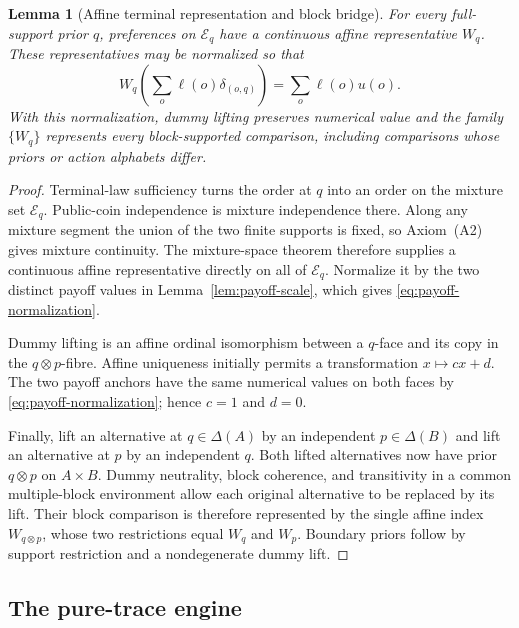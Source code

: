 \documentclass[11pt,a4paper]{article}
\newtheorem{lemma}[theorem]{Lemma}
\theoremstyle{definition}
\newcommand{\D}{\Delta}
\newcommand{\1}{\mathbf 1}
\begin{document}
\begin{lemma}[Affine terminal representation and block bridge]\label{lem:affine-bridge}
For every full-support prior $q$, preferences on $\mathcal E_q$ have a continuous affine representative $W_q$.
These representatives may be normalized so that
\begin{equation}
 W_q\!\left(\sum_o\ell(o)\delta_{(o,q)}\right)=\sum_o\ell(o)u(o).
 \label{eq:payoff-normalization}
\end{equation}
With this normalization, dummy lifting preserves numerical value and the family $\{W_q\}$ represents every
block-supported comparison, including comparisons whose priors or action alphabets differ.
\end{lemma}

\begin{proof}
Terminal-law sufficiency turns the order at $q$ into an order on the mixture set $\mathcal E_q$.  Public-coin
independence is mixture independence there.  Along any mixture segment the union of the two finite supports is fixed,
so Axiom~\textup{(A2)} gives mixture continuity.  The mixture-space theorem therefore supplies a continuous affine
representative directly on all of $\mathcal E_q$.  Normalize it by the two distinct payoff values in
Lemma~\ref{lem:payoff-scale}, which gives
\eqref{eq:payoff-normalization}.

Dummy lifting is an affine ordinal isomorphism between a $q$-face and its copy in the $q\otimes p$-fibre.  Affine
uniqueness initially permits a transformation $x\mapsto cx+d$.  The two payoff anchors have the same numerical values
on both faces by \eqref{eq:payoff-normalization}; hence $c=1$ and $d=0$.

Finally, lift an alternative at $q\in\D(A)$ by an independent $p\in\D(B)$ and lift an alternative at $p$ by an
independent $q$.  Both lifted alternatives now have prior $q\otimes p$ on $A\times B$.  Dummy neutrality, block
coherence, and transitivity in a common multiple-block environment allow each original alternative to be replaced by
its lift.  Their block comparison is therefore represented by the single affine index $W_{q\otimes p}$, whose two
restrictions equal $W_q$ and $W_p$.  Boundary priors follow by support restriction and a nondegenerate dummy lift.
\end{proof}

\subsection{The pure-trace engine}
\end{document}
